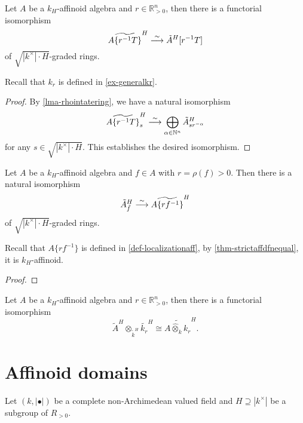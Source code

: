 \begin{proposition}
    Let $A$ be a $k_H$-affinoid algebra and $r\in \mathbb{R}^n_{>0}$, then there is a functorial isomorphism
    \[
        \widetilde{A\{r^{-1}T\}}^H \stackrel{\sim}{\longrightarrow} \tilde{A}^H[r^{-1}T]
    \]
    of $\sqrt{|k^{\times}|\cdot H}$-graded rings.
\end{proposition}
Recall that $k_r$ is defined in \cref{ex-generalkr}.
\begin{proof}
    By \cref{lma-rhointatering}, we have a natural isomorphism
    \[
        \widetilde{A\{r^{-1}T\}}^H_s \stackrel{\sim}{\longrightarrow} \bigoplus_{\alpha\in \mathbb{N}^n} \tilde{A}^H_{s r^{-\alpha}}  
    \]
    for any $s\in \sqrt{|k^{\times}|\cdot H}$. This establishes the desired isomorphism.
\end{proof}

\begin{proposition}
    Let $A$ be a $k_H$-affinoid algebra and $f\in A$ with $r=\rho(f)>0$. Then there is a natural isomorphism
    \[
        \tilde{A}^H_{\tilde{f}}\stackrel{\sim}{\longrightarrow} \widetilde{A\{rf^{-1}\}}^H
    \]
    of $\sqrt{|k^{\times}|\cdot H}$-graded rings.
\end{proposition}
Recall that $A\{rf^{-1}\}$ is defined in \cref{def-localizationaff}, by \cref{thm-strictaffdfnequal}, it is $k_H$-affinoid.
\begin{proof}
    
\end{proof}

\begin{corollary}
    Let $A$ be a $k_H$-affinoid algebra and $r\in \mathbb{R}^n_{>0}$, then there is a functorial isomorphism
    \[
        \tilde{A}^H\otimes_{\tilde{k}^H} \tilde{k_r}^H\cong \widetilde{A\hat{\otimes}_k k_r}^H.  
    \]
\end{corollary}


\section{Affinoid domains}
Let $(k,|\bullet|)$ be a complete non-Archimedean valued field and $H\supseteq |k^{\times}|$ be a subgroup of $R_{>0}$.

